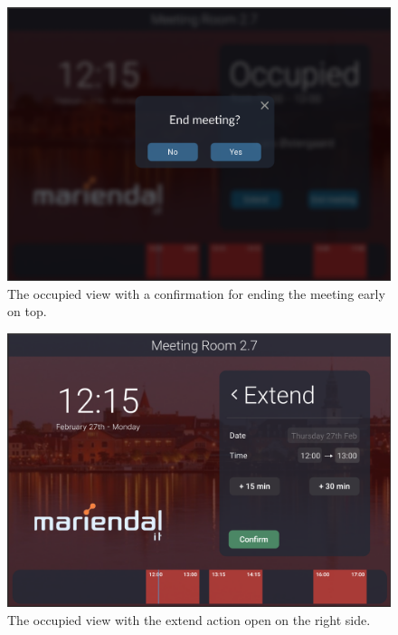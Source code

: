   \begin{figure}[h!]
    \centering
    \includegraphics[width=1\textwidth]{images/occupied_end_confirm.png}
    \caption{The occupied view with a confirmation for ending the meeting early on top.}
    \label{fig:occupied_end}
  \end{figure}

  \begin{figure}[h!]
    \centering
    \includegraphics[width=1\textwidth]{images/occupied_extend_2.png}
    \caption{The occupied view with the extend action open on the right side.}
    \label{fig:occupied_extend2}
  \end{figure}

